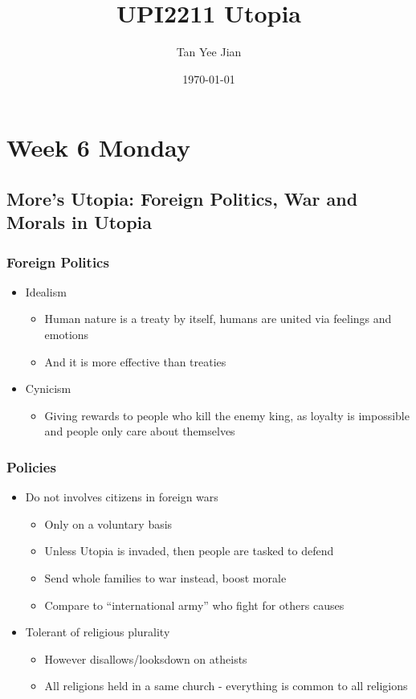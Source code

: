 \documentclass[11pt]{article}
\author{Tan Yee Jian}
\date{\today}
\title{UPI2211 Utopia}
\begin{document}
\maketitle
\tableofcontents

\section{Week 6 Monday}
\label{sec:orge807332}
\subsection{More's Utopia: Foreign Politics, War and Morals in Utopia}
\label{sec:orgff63ad2}
\subsubsection{Foreign Politics}
\label{sec:org36e1b85}
\begin{itemize}
\item Idealism
\begin{itemize}
\item Human nature is a treaty by itself, humans are united via feelings and
emotions
\item And it is more effective than treaties
\end{itemize}
\item Cynicism
\begin{itemize}
\item Giving rewards to people who kill the enemy king, as loyalty is impossible and
people only care about themselves
\end{itemize}
\end{itemize}
\subsubsection{Policies}
\label{sec:orgb449fa9}
\begin{itemize}
\item Do not involves citizens in foreign wars
\begin{itemize}
\item Only on a voluntary basis
\item Unless Utopia is invaded, then people are tasked to defend
\item Send whole families to war instead, boost morale
\item Compare to ``international army'' who fight for others causes
\end{itemize}
\item Tolerant of religious plurality
\begin{itemize}
\item However disallows/looksdown on atheists
\item All religions held in a same church - everything is common to all religions
\end{itemize}
\end{itemize}
\end{document}
